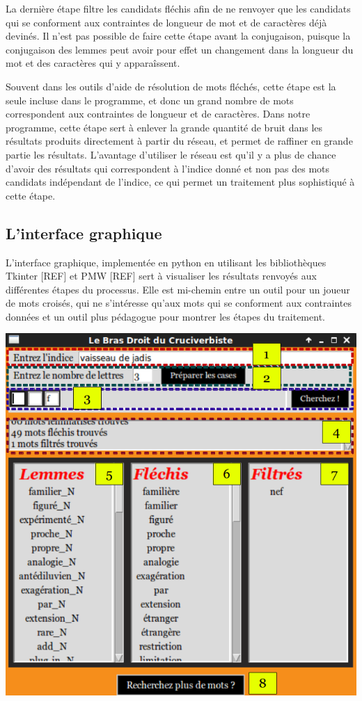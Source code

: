 {La dernière étape filtre les candidats fléchis afin de ne renvoyer que les candidats qui se conforment aux contraintes de longueur de mot et de caractères déjà devinés. Il n'est pas possible de faire cette étape avant la conjugaison, puisque la conjugaison des lemmes peut avoir pour effet un changement dans la longueur du mot et des caractères qui y apparaîssent.

Souvent dans les outils d'aide de résolution de mots fléchés, cette étape est la seule incluse dans le programme, et donc un grand nombre de mots correspondent aux contraintes de longueur et de caractères. Dans notre programme, cette étape sert à enlever la grande quantité de bruit dans les résultats produits directement à partir du réseau, et permet de raffiner en grande partie les résultats. L'avantage d'utiliser le réseau est qu'il y a plus de chance d'avoir des résultats qui correspondent à l'indice donné et non pas des mots candidats indépendant de l'indice, ce qui permet un traitement plus sophistiqué à cette étape.

\subsection{L'interface graphique}

L'interface graphique, implementée en python en utilisant les bibliothèques Tkinter [REF] et PMW [REF] sert à visualiser les résultats renvoyés aux différentes étapes du processus. Elle est mi-chemin entre un outil pour un joueur de mots croisés, qui ne s'intéresse qu'aux mots qui se conforment aux contraintes données et un outil plus pédagogue pour montrer les étapes du traitement.

\begin{center}
\includegraphics{CrossWordInterface.png}
\end{center}

}
